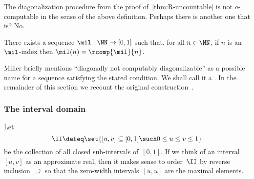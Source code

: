 The diagonalization procedure from the proof of~\cref{thm:R-uncountable} is not $a$-computable in the sense of the above definition. Perhaps there is another one that is? No.

\begin{theorem}[Miller]
  \label{thm:miller-sequence}%
  There exists a sequence $\mil : \NN \to [0,1]$ such that, for all $n \in \NN$, if
  $n$ is an $\mil$-index then $\mil(n) = \rcomp{\mil}{n}$.
\end{theorem}

Miller briefly mentions ``diagonally not computably diagonalizable'' as a possible name for a sequence satisfying the stated condition. We shall call it a .
%
In the remainder of this section we recount the original construction~\cite[Thm.~6.3]{miller04:_cont_deg}.

\subsubsection{The interval domain}
\label{sec:interval-domain}

Let
%
\begin{equation*}
  \II \defeq \set{[u,v] \subseteq [0,1] \such 0 \leq u \leq v \leq 1}
\end{equation*}
%
be the collection of all closed sub-intervals of~$[0,1]$.
If we think of an interval $[u,v]$ as an approximate real, then it makes sense to order~$\II$ by reverse inclusion~$\supseteq$ so that the zero-width intervals~$[u,u]$ are the maximal elements.

